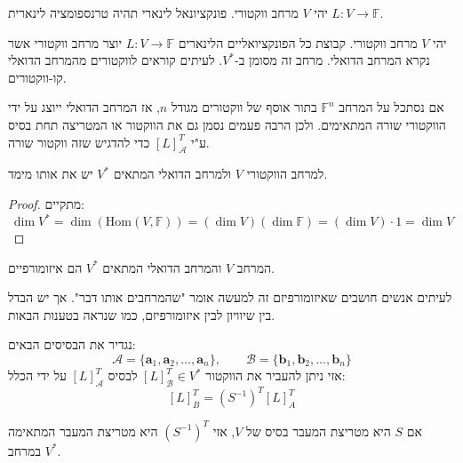\documentclass{tstextbook}
\begin{document}
\begin{definition}
יהי \(V\) מרחב ווקטורי. פונקציונאל לינארי תהיה טרנספומציה לינארית \(L:V\to \mathbb{F}\).

\end{definition}
\begin{definition}
יהי \(V\) מרחב ווקטורי. קבוצת כל הפונקציואליים הלינארים \(L:V\to \mathbb{F}\) יוצר מרחב ווקטורי אשר נקרא המרחב הדואלי. מרחב זה מסומן ב-\(V^{*}\). לעיתים קוראים לווקטורים מהמרחב הדואלי קו-ווקטורים.

\end{definition}
\begin{example}
אם נסתכל על המרחב \(\mathbb{F} ^{n}\) בתור אוסף של ווקטורים מגודל \(n\), אז המרחב הדואלי ייוצג על ידי הווקטורי שורה המתאימים. ולכן הרבה פעמים נסמן גם את הווקטור או המטריצה תחת בסיס ע"י \([L]_{\mathcal{A}}^{T}\) כדי להדגיש שזה ווקטור שורה.

\end{example}
\begin{proposition}
למרחב הווקטורי \(V\) ולמרחב הדואלי המתאים \(V^{*}\) יש את אותו מימד.

\end{proposition}
\begin{proof}
מתקיים:
$$\dim  V^{*}=\dim \left( \mathrm{Hom}\left( V,\mathbb{F}   \right) \right)=\left( \dim V \right)\left( \dim \mathbb{F}   \right)=\left( \dim  V \right)\cdot 1 = \dim V$$

\end{proof}
\begin{corollary}
המרחב \(V\) והמרחב הדואלי המתאים \(V^{*}\) הם איזומורפיים.

\end{corollary}
\begin{remark}
לעיתים אנשים חושבים שאיזומורפיזם זה למעשה אומר "שהמרחבים אותו דבר". אך יש הבדל בין שיוויון לבין איזומורפיזם, כמו שנראה בטענות הבאות.

\end{remark}
\begin{proposition}
נגדיר את הבסיסים הבאים:
$${\mathcal{A}}=\{{\mathbf{a}}_{1},{\mathbf{a}}_{2},\ldots,{\mathbf{a}}_{n}\},\qquad{\mathcal{B}}=\{{\mathbf{b}}_{1},{\mathbf{b}}_{2},\ldots,{\mathbf{b}}_{n}\}$$
אזי ניתן להעביר את הווקטור \([L]^{T}_{\mathcal{B}}\in V^{*}\) לבסיס \([L]_{\mathcal{A}}^{T}\) על ידי הכלל:
$$[L]_{B}^{T}=(S^{-1})^{T}[L]_{A}^{T}$$

\end{proposition}
\begin{corollary}
אם \(S\) היא מטריצת המעבר בסיס של \(V\), אזי \((S^{-1})^{T}\) היא מטריצת המעבר המתאימה במרחב \(V^{*}\).

\end{corollary}
\end{document}
